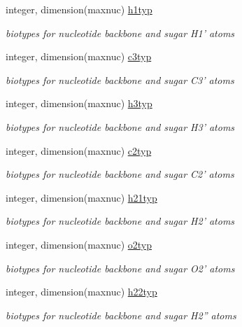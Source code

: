 \begin{DoxyCompactItemize}
integer, dimension(maxnuc) \hyperlink{classresdue_abfce73e98bff9796dcd0952e096b336a}{h1typ}
\begin{DoxyCompactList}\small\item\em biotypes for nucleotide backbone and sugar H1' atoms \end{DoxyCompactList}\item 
integer, dimension(maxnuc) \hyperlink{classresdue_a82523120c873c647aa84cbc82d9c49b4}{c3typ}
\begin{DoxyCompactList}\small\item\em biotypes for nucleotide backbone and sugar C3' atoms \end{DoxyCompactList}\item 
integer, dimension(maxnuc) \hyperlink{classresdue_a5c59bc8e2a978ecd0112210b0cb0f23a}{h3typ}
\begin{DoxyCompactList}\small\item\em biotypes for nucleotide backbone and sugar H3' atoms \end{DoxyCompactList}\item 
integer, dimension(maxnuc) \hyperlink{classresdue_a65adf7bd2d2ac998e7765e55bad0890b}{c2typ}
\begin{DoxyCompactList}\small\item\em biotypes for nucleotide backbone and sugar C2' atoms \end{DoxyCompactList}\item 
integer, dimension(maxnuc) \hyperlink{classresdue_a8b5a106a65951bc071a5bfc7c20a070a}{h21typ}
\begin{DoxyCompactList}\small\item\em biotypes for nucleotide backbone and sugar H2' atoms \end{DoxyCompactList}\item 
integer, dimension(maxnuc) \hyperlink{classresdue_a59687c403572e1626b6d69b8738ed6a6}{o2typ}
\begin{DoxyCompactList}\small\item\em biotypes for nucleotide backbone and sugar O2' atoms \end{DoxyCompactList}\item 
integer, dimension(maxnuc) \hyperlink{classresdue_a75f6e2e38296c7b1427e911d97fbcba4}{h22typ}
\begin{DoxyCompactList}\small\item\em biotypes for nucleotide backbone and sugar H2'' atoms \end{DoxyCompactList}\item 

\end{DoxyCompactItemize}
